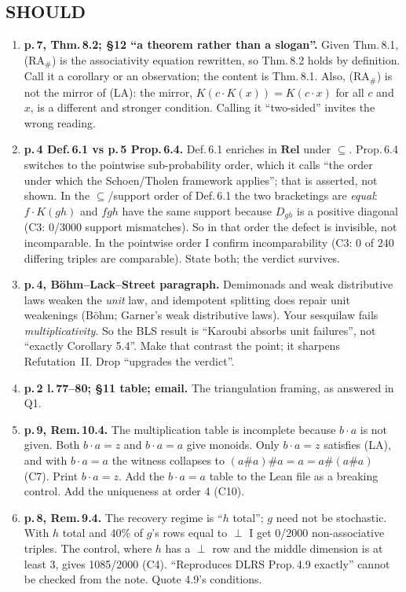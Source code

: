 \documentclass[11pt]{article}
\begin{document}
\subsection*{SHOULD}
\begin{enumerate}[label=\textbf{S\arabic*.},leftmargin=*]
\item \textbf{p.\,7, Thm.\,8.2; \S12 ``a theorem rather than a slogan''.} Given Thm.\,8.1, (RA$_\#$)
  is the associativity equation rewritten, so Thm.\,8.2 holds by definition. Call it a corollary or
  an observation; the content is Thm.\,8.1. Also, (RA$_\#$) is not the mirror of (LA): the mirror,
  $K(c\cdot K(x))=K(c\cdot x)$ for all $c$ and $x$, is a different and stronger condition. Calling
  it ``two-sided'' invites the wrong reading.
\item \textbf{p.\,4 Def.\,6.1 vs p.\,5 Prop.\,6.4.} Def.\,6.1 enriches in $\mathbf{Rel}$ under $\subseteq$.
  Prop.\,6.4 switches to the pointwise sub-probability order, which it calls ``the order under which
  the Schoen/Tholen framework applies''; that is asserted, not shown. In the $\subseteq$/support order
  of Def.\,6.1 the two bracketings are \emph{equal}: $f\cdot K(gh)$ and $fgh$ have the same support
  because $D_{gh}$ is a positive diagonal (C3: 0/3000 support mismatches). So in that order the defect
  is invisible, not incomparable. In the pointwise order I confirm incomparability (C3: 0 of 240
  differing triples are comparable). State both; the verdict survives.
\item \textbf{p.\,4, Böhm--Lack--Street paragraph.} Demimonads and weak distributive laws weaken the
  \emph{unit} law, and idempotent splitting does repair unit weakenings (Böhm; Garner's weak
  distributive laws). Your sesquilaw fails \emph{multiplicativity}. So the BLS result is ``Karoubi
  absorbs unit failures'', not ``exactly Corollary 5.4''. Make that contrast the point; it sharpens
  Refutation~II. Drop ``upgrades the verdict''.
\item \textbf{p.\,2 l.\,77--80; \S11 table; email.} The triangulation framing, as answered in Q1.
\item \textbf{p.\,9, Rem.\,10.4.} The multiplication table is incomplete because $b\cdot a$ is not
  given. Both $b\cdot a=z$ and $b\cdot a=a$ give monoids. Only $b\cdot a=z$ satisfies (LA), and with
  $b\cdot a=a$ the witness collapses to $(a\#a)\#a=a=a\#(a\#a)$ (C7). Print $b\cdot a=z$. Add the
  $b\cdot a=a$ table to the Lean file as a breaking control. Add the uniqueness at order 4 (C10).
\item \textbf{p.\,8, Rem.\,9.4.} The recovery regime is ``$h$ total''; $g$ need not be stochastic.
  With $h$ total and 40\% of $g$'s rows equal to $\perp$ I get 0/2000 non-associative triples. The
  control, where $h$ has a $\perp$ row and the middle dimension is at least 3, gives 1085/2000 (C4).
  ``Reproduces DLRS Prop.\,4.9 exactly'' cannot be checked from the note. Quote 4.9's conditions.
\end{enumerate}
\end{document}
